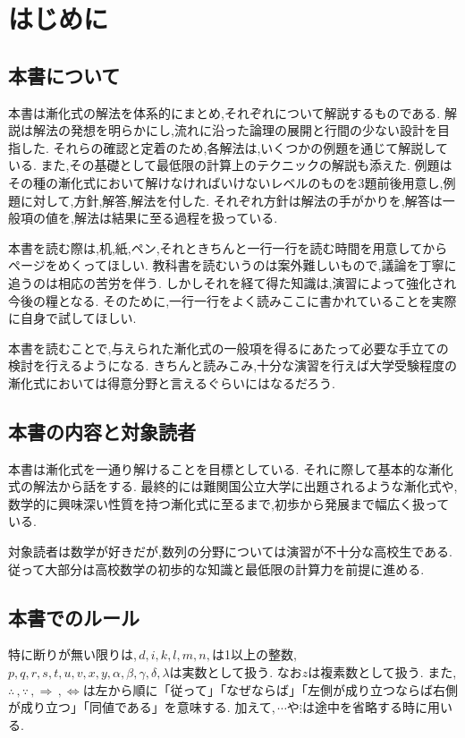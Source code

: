 
\section{はじめに}
  \subsection{本書について}
    本書は漸化式の解法を体系的にまとめ,それぞれについて解説するものである.
    解説は解法の発想を明らかにし,流れに沿った論理の展開と行間の少ない設計を目指した.
    それらの確認と定着のため,各解法は,いくつかの例題を通じて解説している.
    また,その基礎として最低限の計算上のテクニックの解説も添えた.
    例題はその種の漸化式において解けなければいけないレベルのものを3題前後用意し,例題に対して,方針,解答,解法を付した.
    それぞれ方針は解法の手がかりを,解答は一般項の値を,解法は結果に至る過程を扱っている.

    本書を読む際は,机,紙,ペン,それときちんと一行一行を読む時間を用意してからページをめくってほしい.
    教科書を読むいうのは案外難しいもので,議論を丁寧に追うのは相応の苦労を伴う.
    しかしそれを経て得た知識は,演習によって強化され今後の糧となる.
    そのために,一行一行をよく読みここに書かれていることを実際に自身で試してほしい.

    本書を読むことで,与えられた漸化式の一般項を得るにあたって必要な手立ての検討を行えるようになる.
    きちんと読みこみ,十分な演習を行えば大学受験程度の漸化式においては得意分野と言えるぐらいにはなるだろう.     

  \subsection{本書の内容と対象読者}
    本書は漸化式を一通り解けることを目標としている.
    それに際して基本的な漸化式の解法から話をする.
    最終的には難関国公立大学に出題されるような漸化式や,数学的に興味深い性質を持つ漸化式に至るまで,初歩から発展まで幅広く扱っている.
    
    対象読者は数学が好きだが,数列の分野については演習が不十分な高校生である.
    従って大部分は高校数学の初歩的な知識と最低限の計算力を前提に進める.

  \subsection{本書でのルール}
    特に断りが無い限りは,\,$d,i,k,l,m,n,$は1以上の整数,\,$p,q,r,s,t,u,v,x,y,\alpha,\beta,\gamma,\delta,\lambda$は実数として扱う.
    なお$z$は複素数として扱う.
    また,\,$\therefore\,,\because\,,\Rightarrow\,,\Leftrightarrow$は左から順に「従って」「なぜならば」「左側が成り立つならば右側が成り立つ」「同値である」を意味する.
    加えて,\,$\cdots$や$\vdots$は途中を省略する時に用いる.
    

